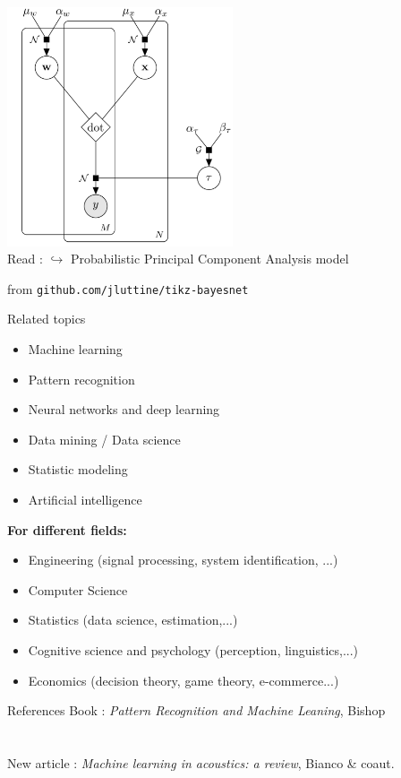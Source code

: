 \documentclass[10pt,xcolor=x11names,compress, show notes]{beamer}%
\begin{document}
\begin{frame}{\insertsectionhead}
\centering
\includegraphics[width=0.5\textwidth]{bayesnet2.png}\\
Read : 
$\hookrightarrow$ Probabilistic Principal Component Analysis model

\vfill
\scriptsize from \texttt{github.com/jluttine/tikz-bayesnet}
\end{frame}



\begin{frame}{Related topics}
\begin{itemize}
	\item Machine learning
        \item Pattern recognition
        \item Neural networks and deep learning
        \item Data mining / Data science
        \item Statistic modeling
        \item Artificial intelligence
\end{itemize}

\textbf{For different fields:}
\begin{itemize}
        \item Engineering (signal processing, system identification, ...)
        \item Computer Science 
        \item Statistics (data science, estimation,...)
        \item Cognitive science and psychology (perception, linguistics,...)
        \item Economics (decision theory, game theory, e-commerce...)
\end{itemize}
\end{frame}


\begin{frame}{References}
Book : \textit{Pattern Recognition and Machine Leaning},  Bishop\\~\\~\\
New article : \textit{Machine learning in acoustics: a review}, Bianco \& coaut.
\end{frame}
\end{document}
